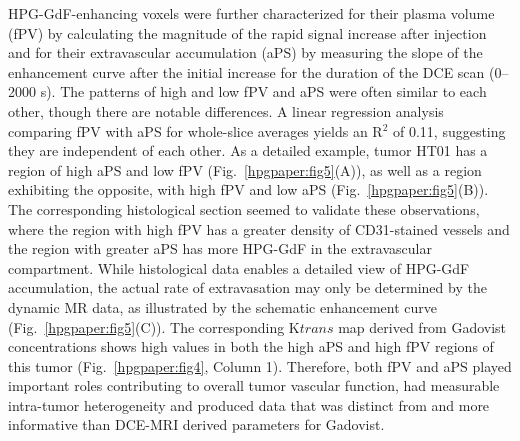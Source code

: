 HPG-GdF-enhancing voxels were further characterized for their plasma volume (fPV) by calculating the magnitude of the rapid signal increase after injection and for their extravascular accumulation (aPS) by measuring the slope of the enhancement curve after the initial increase for the duration of the DCE scan (0–2000 s).
The patterns of high and low fPV and aPS were often similar to each other, though there are notable differences.
A linear regression analysis comparing fPV with aPS for whole-slice averages yields an R$^2$ of 0.11, suggesting they are independent of each other.
As a detailed example, tumor HT01 has a region of high aPS and low fPV (Fig.~\ref{hpgpaper:fig5}(A)), as well as a region exhibiting the opposite, with high fPV and low aPS (Fig.~\ref{hpgpaper:fig5}(B)).
The corresponding histological section seemed to validate these observations, where the region with high fPV has a greater density of CD31-stained vessels and the region with greater aPS has more HPG-GdF in the extravascular compartment.
While histological data enables a detailed view of HPG-GdF accumulation, the actual rate of extravasation may only be determined by the dynamic MR data, as illustrated by the schematic enhancement curve (Fig.~\ref{hpgpaper:fig5}(C)).
The corresponding K${trans}$ map derived from Gadovist concentrations shows high values in both the high aPS and high fPV regions of this tumor (Fig.~\ref{hpgpaper:fig4}, Column 1).
Therefore, both fPV and aPS played important roles contributing to overall tumor vascular function, had measurable intra-tumor heterogeneity and produced data that was distinct from and more informative than DCE-MRI derived parameters for Gadovist.

